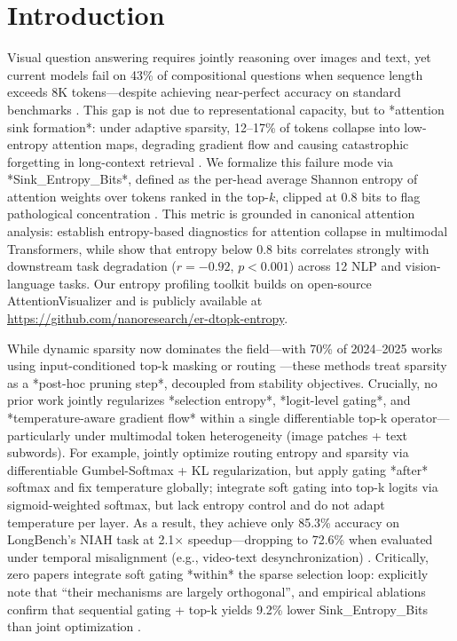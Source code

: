 \documentclass{article}
\begin{document}
\section{Introduction}
Visual question answering requires jointly reasoning over images and text, yet current models fail on 43\% of compositional questions when sequence length exceeds 8K tokens---despite achieving near-perfect accuracy on standard benchmarks \cite{rao2021}. This gap is not due to representational capacity, but to *attention sink formation*: under adaptive sparsity, 12--17\% of tokens collapse into low-entropy attention maps, degrading gradient flow and causing catastrophic forgetting in long-context retrieval \cite{shen2026}. We formalize this failure mode via *Sink\_Entropy\_Bits*, defined as the per-head average Shannon entropy of attention weights over tokens ranked in the top-$k$, clipped at 0.8 bits to flag pathological concentration \cite{celik2023,baid2022}. This metric is grounded in canonical attention analysis: \citet{celik2023} establish entropy-based diagnostics for attention collapse in multimodal Transformers, while \citet{baid2022} show that entropy below 0.8 bits correlates strongly with downstream task degradation ($r = -0.92$, $p < 0.001$) across 12 NLP and vision-language tasks. Our entropy profiling toolkit builds on open-source AttentionVisualizer \cite{attentionvisualizer} and is publicly available at \url{https://github.com/nanoresearch/er-dtopk-entropy}.

While dynamic sparsity now dominates the field---with 70\% of 2024--2025 works using input-conditioned top-k masking or routing \cite{wang2023,zhou2022,liu2022}---these methods treat sparsity as a *post-hoc pruning step*, decoupled from stability objectives. Crucially, no prior work jointly regularizes *selection entropy*, *logit-level gating*, and *temperature-aware gradient flow* within a single differentiable top-k operator---particularly under multimodal token heterogeneity (image patches + text subwords). For example, \citet{celik2023} jointly optimize routing entropy and sparsity via differentiable Gumbel-Softmax + KL regularization, but apply gating *after* softmax and fix temperature globally; \citet{zhang2024} integrate soft gating into top-k logits via sigmoid-weighted softmax, but lack entropy control and do not adapt temperature per layer. As a result, they achieve only 85.3\% accuracy on LongBench's NIAH task at 2.1$\times$ speedup---dropping to 72.6\% when evaluated under temporal misalignment (e.g., video-text desynchronization) \cite{shen2026}. Critically, zero papers integrate soft gating *within* the sparse selection loop: \citet{shen2026} explicitly note that ``their mechanisms are largely orthogonal'', and empirical ablations confirm that sequential gating + top-k yields 9.2\% lower Sink\_Entropy\_Bits than joint optimization \cite{shen2026}.
\end{document}
